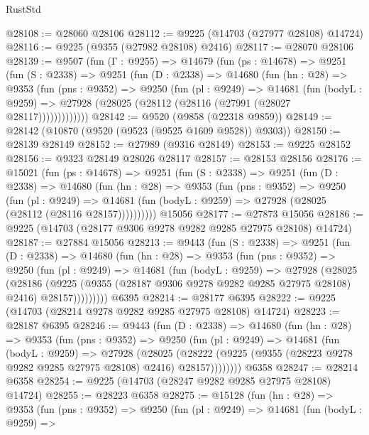 \begin{lexlean}{RustStd}
\begin{coremodule}
@28108 := @28060 @28106
@28112 := @9225 (@14703 (@27977 @28108) @14724)
@28116 := @9225 (@9355 (@27982 @28108) @2416)
@28117 := @28070 @28106
@28139 := @9507
    (fun (Γ : @9255) =>
    @14679
      (fun (ps : @14678) =>
      @9251
        (fun (S : @2338) =>
        @9251
          (fun (D : @2338) =>
          @14680
            (fun (hn : @28) =>
            @9353
              (fun (pns : @9352) =>
              @9250
                (fun (pl : @9249) =>
                @14681
                  (fun (bodyL : @9259) =>
                  @27928 (@28025 (@28112 (@28116 (@27991 (@28027 @28117)))))))))))))
@28142 := @9520 (@9858 (@22318 @9859))
@28149 := @28142 (@10870 (@9520 (@9523 (@9525 @1609 @9528)) @9303))
@28150 := @28139 @28149
@28152 := @27989 (@9316 @28149)
@28153 := @9225 @28152
@28156 := @9323 @28149 @28026 @28117
@28157 := @28153 @28156
@28176 := @15021
    (fun (ps : @14678) =>
    @9251
      (fun (S : @2338) =>
      @9251
        (fun (D : @2338) =>
        @14680
          (fun (hn : @28) =>
          @9353
            (fun (pns : @9352) =>
            @9250
              (fun (pl : @9249) =>
              @14681 (fun (bodyL : @9259) => @27928 (@28025 (@28112 (@28116 @28157))))))))))
    @15056
@28177 := @27873 @15056
@28186 := @9225 (@14703 (@28177 @9306 @9278 @9282 @9285 @27975 @28108) @14724)
@28187 := @27884 @15056
@28213 := @9443
    (fun (S : @2338) =>
    @9251
      (fun (D : @2338) =>
      @14680
        (fun (hn : @28) =>
        @9353
          (fun (pns : @9352) =>
          @9250
            (fun (pl : @9249) =>
            @14681
              (fun (bodyL : @9259) =>
              @27928
                (@28025
                  (@28186
                    (@9225
                      (@9355 (@28187 @9306 @9278 @9282 @9285 @27975 @28108) @2416)
                      @28157)))))))))
    @6395
@28214 := @28177 @6395
@28222 := @9225 (@14703 (@28214 @9278 @9282 @9285 @27975 @28108) @14724)
@28223 := @28187 @6395
@28246 := @9443
    (fun (D : @2338) =>
    @14680
      (fun (hn : @28) =>
      @9353
        (fun (pns : @9352) =>
        @9250
          (fun (pl : @9249) =>
          @14681
            (fun (bodyL : @9259) =>
            @27928
              (@28025
                (@28222 (@9225 (@9355 (@28223 @9278 @9282 @9285 @27975 @28108) @2416) @28157))))))))
    @6358
@28247 := @28214 @6358
@28254 := @9225 (@14703 (@28247 @9282 @9285 @27975 @28108) @14724)
@28255 := @28223 @6358
@28275 := @15128
    (fun (hn : @28) =>
    @9353
      (fun (pns : @9352) =>
      @9250
        (fun (pl : @9249) =>
        @14681
          (fun (bodyL : @9259) =>

\end{coremodule}
\end{lexlean}
